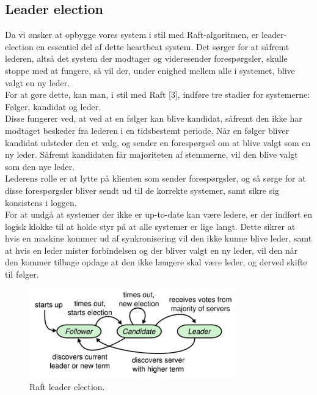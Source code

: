\documentclass[a4paper,12pt]{article}
\begin{document}
\subsection{Leader election} 
Da vi ønsker at opbygge vores system i stil med Raft-algoritmen, er leader-election en essentiel del af dette heartbeat system. Det sørger for at såfremt lederen, altså det system der modtager og videresender forespørgsler, skulle stoppe med at fungere, så vil der, under enighed mellem alle i systemet, blive valgt en ny leder.
\\
For at gøre dette, kan man, i stil med Raft [3], indføre tre stadier for systemerne:
\\
Følger, kandidat og leder.
\\[5px]
Disse fungerer ved, at ved at en følger kan blive kandidat, såfremt den ikke har modtaget beskeder fra lederen i en tidsbestemt periode. Når en følger bliver kandidat udsteder den et valg, og sender en forespørgsel om at blive valgt som en ny leder. Såfremt kandidaten får majoriteten af stemmerne, vil den blive valgt som den nye leder.
\\
Lederens rolle er at lytte på klienten som sender forespørgsler, og så sørge for at disse forespørgsler bliver sendt ud til de korrekte systemer, samt sikre sig konsistens i loggen.
\\
For at undgå at systemer der ikke er up-to-date kan være ledere, er der indført en logisk klokke til at holde styr på at alle systemer er lige langt. 
Dette sikrer at hvis en maskine kommer ud af synkronisering vil den ikke kunne blive leder, samt at hvis en leder mister forbindelsen og der bliver valgt en ny leder, vil den når den kommer tilbage opdage at den ikke længere skal være leder, og derved skifte til følger.
\\
\begin{figure}[H]
  \caption{Raft leader election.}
  \centering
    \includegraphics[width=0.8\textwidth]{Raftleaderelection.png}
\end{figure}
\end{document}

